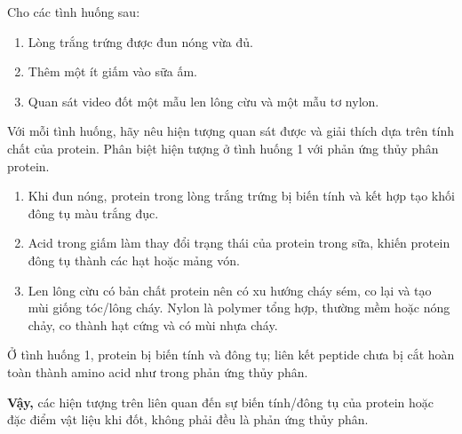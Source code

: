 \begin{tuluyen}
Cho các tình huống sau:
\begin{enumerate}
\item Lòng trắng trứng được đun nóng vừa đủ.
\item Thêm một ít giấm vào sữa ấm.
\item Quan sát video đốt một mẫu len lông cừu và một mẫu tơ nylon.
\end{enumerate}
Với mỗi tình huống, hãy nêu hiện tượng quan sát được và giải thích dựa trên tính chất của protein. Phân biệt hiện tượng ở tình huống 1 với phản ứng thủy phân protein.
\begin{loigiaiBT}
\begin{enumerate}
\item Khi đun nóng, protein trong lòng trắng trứng bị biến tính và kết hợp tạo khối đông tụ màu trắng đục.
\item Acid trong giấm làm thay đổi trạng thái của protein trong sữa, khiến protein đông tụ thành các hạt hoặc mảng vón.
\item Len lông cừu có bản chất protein nên có xu hướng cháy sém, co lại và tạo mùi giống tóc/lông cháy. Nylon là polymer tổng hợp, thường mềm hoặc nóng chảy, co thành hạt cứng và có mùi nhựa cháy.
\end{enumerate}

Ở tình huống 1, protein bị biến tính và đông tụ; liên kết peptide chưa bị cắt hoàn toàn thành amino acid như trong phản ứng thủy phân.

\textbf{Vậy,} các hiện tượng trên liên quan đến sự biến tính/đông tụ của protein hoặc đặc điểm vật liệu khi đốt, không phải đều là phản ứng thủy phân.
\end{loigiaiBT}
\end{tuluyen}



